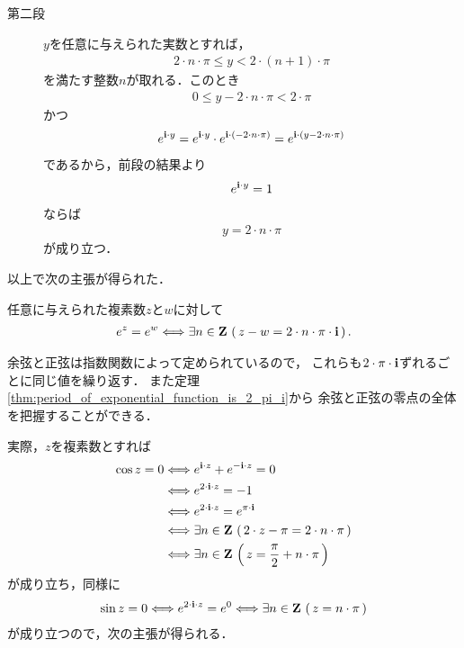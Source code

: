 \begin{sketch}
\begin{description}
			\item[第二段]
				$y$を任意に与えられた実数とすれば，
				\begin{align}
					2 \cdot n \cdot \pi \leq y < 2 \cdot (n+1) \cdot \pi
				\end{align}
				を満たす整数$n$が取れる．このとき
				\begin{align}
					0 \leq y - 2 \cdot n \cdot \pi < 2 \cdot \pi
				\end{align}
				かつ
				\begin{align}
					e^{\mathbf{i} \cdot y}
					= e^{\mathbf{i} \cdot y} \cdot e^{\mathbf{i} \cdot (- 2 \cdot n \cdot \pi)}
					= e^{\mathbf{i} \cdot (y - 2 \cdot n \cdot \pi)}
				\end{align}
				であるから，前段の結果より
				\begin{align}
					e^{\mathbf{i} \cdot y} = 1
				\end{align}
				ならば
				\begin{align}
					y = 2 \cdot n \cdot \pi
				\end{align}
				が成り立つ．
				\QED
		\end{description}
	\end{sketch}
	
	以上で次の主張が得られた．
	\begin{screen}
		\begin{thm}
		\label{thm:period_of_exponential_function_is_2_pi_i}
			任意に与えられた複素数$z$と$w$に対して
			\begin{align}
				e^{z} = e^{w} \Longleftrightarrow 
				\exists n \in \mathbf{Z}\, \left(\, z - w = 2 \cdot n \cdot \pi \cdot \mathbf{i}\, \right).
			\end{align}
		\end{thm}
	\end{screen}
	
	余弦と正弦は指数関数によって定められているので，
	これらも$2 \cdot \pi \cdot \mathbf{i}$ずれるごとに同じ値を繰り返す．
	また定理\ref{thm:period_of_exponential_function_is_2_pi_i}から
	余弦と正弦の零点の全体を把握することができる．
	
	実際，$z$を複素数とすれば
	\begin{align}
		\cos{z} = 0 
		&\Longleftrightarrow e^{\mathbf{i} \cdot z} + e^{-\mathbf{i} \cdot z} = 0 \\
		&\Longleftrightarrow e^{2 \cdot \mathbf{i} \cdot z} = -1 \\
		&\Longleftrightarrow e^{2 \cdot \mathbf{i} \cdot z} = e^{\pi \cdot \mathbf{i}} \\
		&\Longleftrightarrow \exists n \in \mathbf{Z}\,
		\left(\, 2 \cdot z - \pi = 2 \cdot n \cdot \pi\, \right) \\
		&\Longleftrightarrow \exists n \in \mathbf{Z}\,
		\left(\, z = \frac{\pi}{2} + n \cdot \pi\, \right)
	\end{align}
	が成り立ち，同様に
	\begin{align}
		\sin{z} = 0
		\Longleftrightarrow e^{2 \cdot \mathbf{i} \cdot z} = e^{0}
		\Longleftrightarrow \exists n \in \mathbf{Z}\, \left(\, z = n \cdot \pi\, \right)
	\end{align}
	が成り立つので，次の主張が得られる．
	
